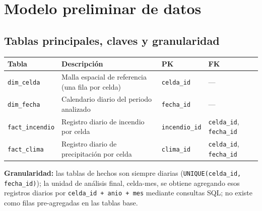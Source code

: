 \documentclass[11pt,a4paper]{article}
\begin{document}
\section{Modelo preliminar de datos}

\subsection{Tablas principales, claves y granularidad}
\small
\begin{center}
\begin{tabular}{@{}L{2.6cm}L{6.4cm}C{2.1cm}C{3.0cm}@{}}
\toprule
\textbf{Tabla} & \textbf{Descripci\'on} & \textbf{PK} & \textbf{FK} \\
\midrule
\texttt{dim\_celda} & Malla espacial de referencia (una fila por celda) & \texttt{celda\_id} & --- \\
\texttt{dim\_fecha} & Calendario diario del periodo analizado & \texttt{fecha\_id} & --- \\
\texttt{fact\_incendio} & Registro diario de incendio por celda & \texttt{incendio\_id} & \texttt{celda\_id}, \texttt{fecha\_id} \\
\texttt{fact\_clima} & Registro diario de precipitaci\'on por celda & \texttt{clima\_id} & \texttt{celda\_id}, \texttt{fecha\_id} \\
\bottomrule
\end{tabular}
\end{center}
\normalsize

\noindent\footnotesize\textbf{Granularidad:} las tablas de hechos son siempre diarias (\texttt{UNIQUE(celda\_id, fecha\_id)}); la unidad de an\'alisis final, celda-mes, se obtiene agregando esos registros diarios por \texttt{celda\_id + anio + mes} mediante consultas SQL; no existe como filas pre-agregadas en las tablas base.\normalsize
\end{document}
